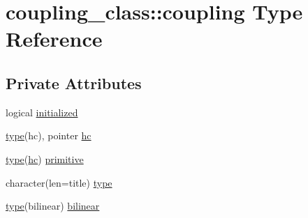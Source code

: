 \hypertarget{structcoupling__class_1_1coupling}{\section{coupling\+\_\+class\+:\+:coupling Type Reference}
\label{structcoupling__class_1_1coupling}
}
\subsection*{Private Attributes}
\begin{DoxyCompactItemize}
\item 
logical \hyperlink{structcoupling__class_1_1coupling_affedc100d4678792285e848dd4deb313}{initialized}
\item 
\hyperlink{structcoupling__class_1_1coupling_a74b13fd447f07c24380e3913fd06d545}{type}(hc), pointer \hyperlink{structcoupling__class_1_1coupling_a2592edb5bbaf558a6196d78782c17ac2}{hc}
\item 
\hyperlink{structcoupling__class_1_1coupling_a74b13fd447f07c24380e3913fd06d545}{type}(\hyperlink{structcoupling__class_1_1coupling_a2592edb5bbaf558a6196d78782c17ac2}{hc}) \hyperlink{structcoupling__class_1_1coupling_a330aec84b5697ea890627c9a10562fb5}{primitive}
\item 
character(len=title) \hyperlink{structcoupling__class_1_1coupling_a74b13fd447f07c24380e3913fd06d545}{type}
\item 
\hyperlink{structcoupling__class_1_1coupling_a74b13fd447f07c24380e3913fd06d545}{type}(bilinear) \hyperlink{structcoupling__class_1_1coupling_a64232ba94787370a17c636014e966d13}{bilinear}
\end{DoxyCompactItemize}


